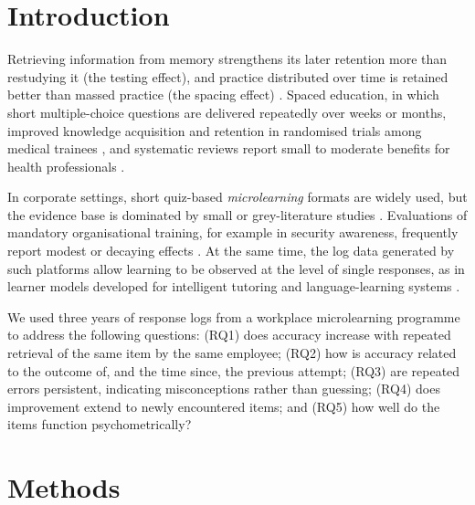 \section{Introduction}

Retrieving information from memory strengthens its later retention more than restudying it
(the testing effect), and practice distributed over time is retained better than massed practice
(the spacing effect) \citep{roediger2006,cepeda2006,cepeda2008}. Spaced education, in which short
multiple-choice questions are delivered repeatedly over weeks or months, improved knowledge
acquisition and retention in randomised trials among medical trainees
\citep{kerfoot2007urology,kerfoot2007mededuc,kerfoot2009}, and systematic reviews report small to
moderate benefits for health professionals \citep{phillips2019,martinengo2024}.

In corporate settings, short quiz-based \emph{microlearning} formats are widely used, but the
evidence base is dominated by small or grey-literature studies \citep{taylor2022}. Evaluations of
mandatory organisational training, for example in security awareness, frequently report modest or
decaying effects \citep{reinheimer2020,lain2022,ho2025}. At the same time, the log data generated by
such platforms allow learning to be observed at the level of single responses, as in learner models
developed for intelligent tutoring and language-learning systems
\citep{corbett1994,pavlik2009,settles2016,tabibian2019,koedinger2023}.

 We used three years of
response logs from a workplace microlearning programme to address the following questions:
(RQ1) does accuracy increase with repeated retrieval of the same item by the same employee;
(RQ2) how is accuracy related to the outcome of, and the time since, the previous attempt;
(RQ3) are repeated errors persistent, indicating misconceptions rather than guessing;
(RQ4) does improvement extend to newly encountered items; and
(RQ5) how well do the items function psychometrically?

\section{Methods}

